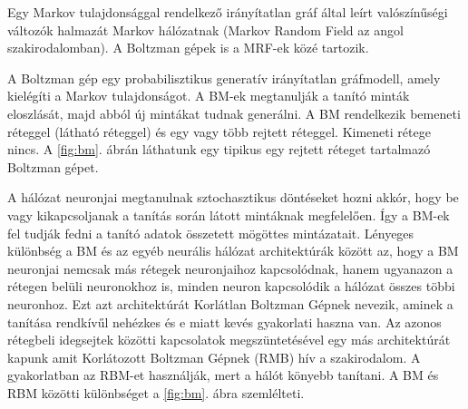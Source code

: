
Egy Markov tulajdonsággal rendelkező irányítatlan gráf által leírt valószínűségi változók halmazát Markov hálózatnak (Markov Random Field az angol szakirodalomban). A Boltzman gépek is a MRF-ek közé tartozik.

A Boltzman gép egy probabilisztikus generatív irányítatlan gráfmodell, amely kielégíti a Markov tulajdonságot. A BM-ek megtanulják a tanító minták eloszlását, majd abból új mintákat tudnak generálni. A BM rendelkezik bemeneti réteggel (látható réteggel) és egy vagy több rejtett réteggel. Kimeneti rétege nincs. A \ref{fig:bm}. ábrán láthatunk egy tipikus egy rejtett réteget tartalmazó Boltzman gépet.





A hálózat neuronjai megtanulnak sztochasztikus döntéseket hozni akkór, hogy be vagy kikapcsoljanak a tanítás során látott mintáknak megfelelően. Így a BM-ek fel tudják fedni a tanító adatok összetett mögöttes mintázatait. Lényeges különbség a BM és az egyéb neurális hálózat architektúrák között az, hogy a BM neuronjai nemcsak más rétegek neuronjaihoz kapcsolódnak, hanem ugyanazon a rétegen belüli neuronokhoz is, minden neuron kapcsolódik a hálózat összes többi neuronhoz. Ezt azt architektúrát Korlátlan Boltzman Gépnek nevezik, aminek a tanítása rendkívűl nehézkes és e miatt kevés gyakorlati haszna van. Az azonos rétegbeli idegsejtek közötti kapcsolatok megszüntetésével egy más architektúrát kapunk amit Korlátozott Boltzman Gépnek (RMB) hív a szakirodalom. A gyakorlatban az RBM-et használják, mert a hálót könyebb tanítani. A BM és RBM közötti különbséget a \ref{fig:bm}. ábra szemlélteti.

